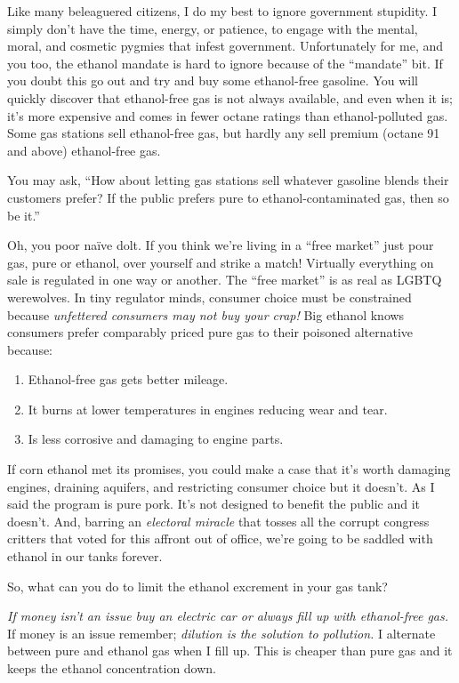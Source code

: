 Like many beleaguered citizens, I do my best to ignore government
stupidity. I simply don't have the time, energy, or patience, to engage
with the mental, moral, and cosmetic pygmies that infest government.
Unfortunately for me, and you too, the ethanol mandate is hard to ignore
because of the ``mandate'' bit. If you doubt this go out and try and buy
some ethanol-free gasoline. You will quickly discover that ethanol-free
gas is not always available, and even when it is; it's more expensive
and comes in fewer octane ratings than ethanol-polluted gas. Some gas
stations sell ethanol-free gas, but hardly any sell premium
(octane 91 and above) ethanol-free gas.

You may ask, ``How about letting gas stations sell whatever gasoline
blends their customers prefer? If the public prefers pure to
ethanol-contaminated gas, then so be it.''

Oh, you poor naïve dolt. If you think we're living in a ``free market''
just pour gas, pure or ethanol, over yourself and strike a match!
Virtually everything on sale is regulated in one way or another. The
``free market'' is as real as LGBTQ werewolves. In tiny regulator minds,
consumer choice must be constrained because \emph{unfettered consumers
may not buy your crap!} Big ethanol knows consumers prefer comparably
priced pure gas to their poisoned alternative because:

\begin{enumerate}
\def\labelenumi{\arabic{enumi}.}
\tightlist
\item
  Ethanol-free gas gets better mileage.
\item
  It burns at lower temperatures in engines reducing wear and tear.
\item
  Is less corrosive and damaging to engine parts.
\end{enumerate}

If corn ethanol met its promises, you could make a case that it's worth
damaging engines, draining aquifers, and restricting consumer choice but
it doesn't. As I said the program is pure pork. It's not designed to
benefit the public and it doesn't. And, barring an \emph{electoral
miracle} that tosses all the corrupt congress critters that voted for
this affront out of office, we're going to be saddled with ethanol in
our tanks forever.

So, what can you do to limit the ethanol excrement in your gas tank?

\emph{If money isn't an issue buy an electric car or always fill up with
ethanol-free gas.} If money is an issue remember; \emph{dilution is the
solution to pollution.} I alternate between pure and ethanol gas when I
fill up. This is cheaper than pure gas and it keeps the ethanol
concentration down.

